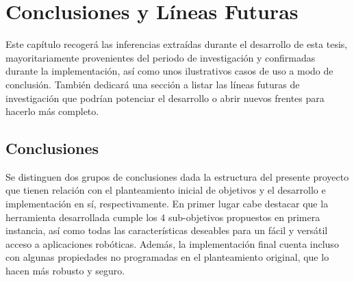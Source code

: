 \chapter{Conclusiones y Líneas Futuras}

Este capítulo recogerá las inferencias extraídas durante el desarrollo de esta tesis, mayoritariamente provenientes del periodo de investigación y confirmadas durante la implementación, así como unos ilustrativos casos de uso a modo de conclusión. También dedicará una sección a listar las líneas futuras de investigación que podrían potenciar el desarrollo o abrir nuevos frentes para hacerlo más completo.

\section{Conclusiones} 

Se distinguen dos grupos de conclusiones dada la estructura del presente proyecto que tienen relación con el planteamiento inicial de objetivos y el desarrollo e implementación en sí, respectivamente.
En primer lugar cabe destacar que la herramienta desarrollada cumple los 4 sub-objetivos propuestos en primera instancia, así como todas las características deseables para un fácil y versátil acceso a aplicaciones robóticas. Además, la implementación final cuenta incluso con algunas propiedades no programadas en el planteamiento original, que lo hacen más robusto y seguro.


